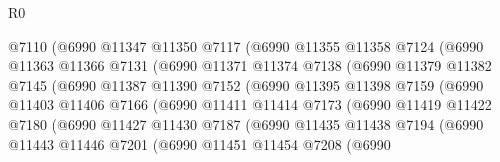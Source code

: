 \begin{lexlean}{R0}
\begin{coremodule}
                        @7110
                        (@6990
                          @11347
                          @11350
                          @7117
                          (@6990
                            @11355
                            @11358
                            @7124
                            (@6990
                              @11363
                              @11366
                              @7131
                              (@6990
                                @11371
                                @11374
                                @7138
                                (@6990
                                  @11379
                                  @11382
                                  @7145
                                  (@6990
                                    @11387
                                    @11390
                                    @7152
                                    (@6990
                                      @11395
                                      @11398
                                      @7159
                                      (@6990
                                        @11403
                                        @11406
                                        @7166
                                        (@6990
                                          @11411
                                          @11414
                                          @7173
                                          (@6990
                                            @11419
                                            @11422
                                            @7180
                                            (@6990
                                              @11427
                                              @11430
                                              @7187
                                              (@6990
                                                @11435
                                                @11438
                                                @7194
                                                (@6990
                                                  @11443
                                                  @11446
                                                  @7201
                                                  (@6990
                                                    @11451
                                                    @11454
                                                    @7208
                                                    (@6990

\end{coremodule}
\end{lexlean}
